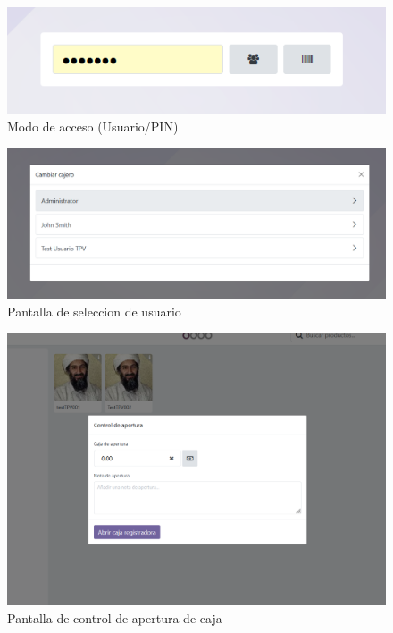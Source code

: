 \documentclass[a4paper,12pt]{article}
\begin{document}
\begin{figure}[h!]
    \centering
    \includegraphics[width=1\textwidth]{pr2odoo51-modoAcceso.png}
    \caption{Modo de acceso (Usuario/PIN)}
\end{figure}
\FloatBarrier

\begin{figure}[h!]
    \centering
    \includegraphics[width=1\textwidth]{pr2odoo52-escojerCajero.png}
    \caption{Pantalla de seleccion de usuario}
\end{figure}
\FloatBarrier

\begin{figure}[h!]
    \centering
    \includegraphics[width=1\textwidth]{pr2odoo53-controlAperturaCaja.png}
    \caption{Pantalla de control de apertura de caja}
\end{figure}
\FloatBarrier
\end{document}

